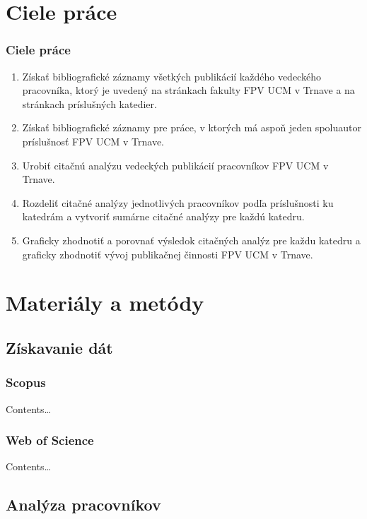 \documentclass{beamer}
\begin{document}
\section{Ciele práce}

\begin{frame}
\frametitle{Ciele práce}

\begin{enumerate}
\item<1-> Získať bibliografické záznamy všetkých publikácií každého vedeckého
  pracovníka, ktorý je uvedený na stránkach fakulty FPV UCM v Trnave a na
  stránkach príslušných katedier.
\item<2-> Získať bibliografické záznamy pre práce, v ktorých má aspoň jeden
  spoluautor príslušnosť FPV UCM v Trnave.
\item<3-> Urobiť citačnú analýzu vedeckých publikácií pracovníkov FPV UCM v
  Trnave.
\item<4-> Rozdeliť citačné analýzy jednotlivých pracovníkov podľa príslušnosti
  ku katedrám a vytvoriť sumárne citačné analýzy pre každú katedru.
\item<5-> Graficky zhodnotiť a porovnať výsledok citačných analýz pre každu
  katedru a graficky zhodnotiť vývoj publikačnej činnosti FPV UCM v Trnave.
\end{enumerate}

\end{frame}


\section{Materiály a metódy}

\subsection{Získavanie dát}

\begin{frame}
\frametitle{Scopus}

Contents\dots


\end{frame}

\begin{frame}
\frametitle{Web of Science}

Contents\dots


\end{frame}

\subsection{Analýza pracovníkov}
\end{document}
